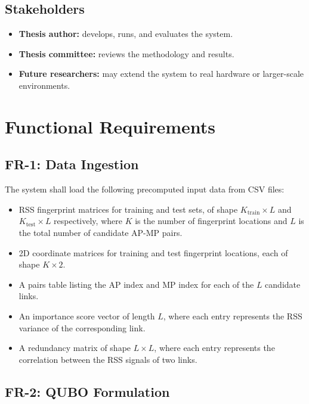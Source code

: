 \documentclass[12pt,a4paper]{article}
\begin{document}
\subsection{Stakeholders}

\begin{itemize}[leftmargin=2em]
    \item \textbf{Thesis author:} develops, runs, and evaluates the system.
    \item \textbf{Thesis committee:} reviews the methodology and results.
    \item \textbf{Future researchers:} may extend the system to real hardware
          or larger-scale environments.
\end{itemize}

\section{Functional Requirements}

\subsection{FR-1: Data Ingestion}

The system shall load the following precomputed input data from CSV files:

\begin{itemize}[leftmargin=2em]
    \item RSS fingerprint matrices for training and test sets, of shape
          $K_{\text{train}} \times L$ and $K_{\text{test}} \times L$
          respectively, where $K$ is the number of fingerprint locations and
          $L$ is the total number of candidate AP-MP pairs.
    \item 2D coordinate matrices for training and test fingerprint locations,
          each of shape $K \times 2$.
    \item A pairs table listing the AP index and MP index for each of the
          $L$ candidate links.
    \item An importance score vector of length $L$, where each entry
          represents the RSS variance of the corresponding link.
    \item A redundancy matrix of shape $L \times L$, where each entry
          represents the correlation between the RSS signals of two links.
\end{itemize}

\subsection{FR-2: QUBO Formulation}
\end{document}
